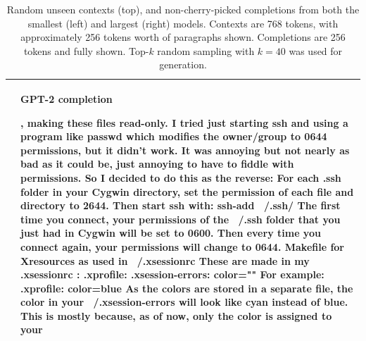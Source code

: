 \documentclass{article}
\begin{document}
\begin{table}[t]
\begin{center}
\begin{tabular}{|p{8cm}|p{8cm}|}
  &
  \centerline{\textbf{GPT-2 completion}}
, making these files read-only. I tried just starting ssh and using a program like passwd which modifies the owner/group to 0644 permissions, but it didn't work. It was annoying but not nearly as bad as it could be, just annoying to have to fiddle with permissions.
\newline\newline
So I decided to do this as the reverse:
\newline\newline
For each .ssh folder in your Cygwin directory, set the permission of each file and directory to 2644. Then start ssh with: ssh-add ~/.ssh/
\newline\newline
The first time you connect, your permissions of the ~/.ssh folder that you just had in Cygwin will be set to 0600. Then every time you connect again, your permissions will change to 0644.
\newline\newline
Makefile for Xresources as used in ~/.xsessionrc
\newline\newline
These are made in my .xsessionrc :
\newline\newline
.xprofile: .xsession-errors: color=""
\newline\newline
For example:
\newline\newline
.xprofile: color=blue
\newline\newline
As the colors are stored in a separate file, the color in your ~/.xsession-errors will look like cyan instead of blue.
\newline\newline
This is mostly because, as of now, only the color is assigned to your

 \\
\hline


\end{tabular}
\caption{Random unseen contexts (top), and non-cherry-picked completions from both the smallest (left) and largest (right) models. Contexts are 768 tokens, with approximately 256 tokens worth of paragraphs shown.  Completions are 256 tokens and fully shown.
Top-$k$ random sampling with $k = 40$ was used for generation.}
\label{samplescompare5}
\end{center}
\end{table}
\end{document}

